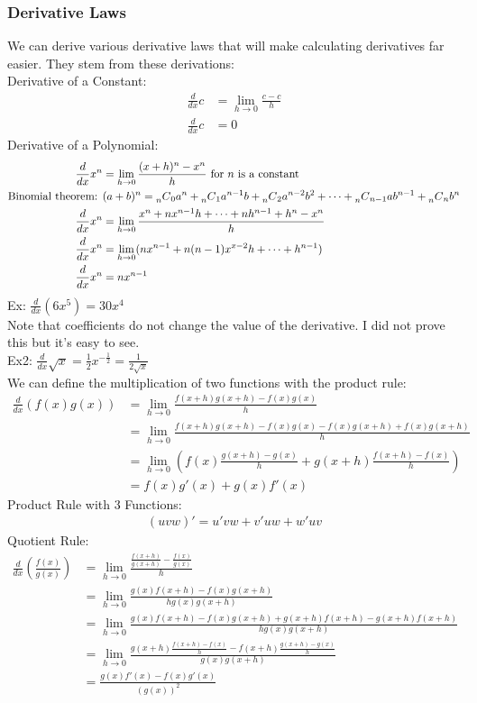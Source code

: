 \documentclass[11pt, fleqn]{article}
\begin{document}
\subsubsection{Derivative Laws}
We can derive various derivative laws that will make calculating derivatives far easier. They stem from these derivations:\\
Derivative of a Constant:
\begin{align*}
    \frac{d}{dx}c&=\lim_{h\to 0}\frac{c-c}{h}\\
    \frac{d}{dx}c&=0
\end{align*}
Derivative of a Polynomial:
\begin{align*}
    \frac{d}{dx}x^n&=\lim\limits_{h\to 0}\frac{(x+h)^n-x^n}{h}\text{ for $n$ is a constant}\\
    \text{Binomial theorem: }& (a+b)^n=\prescript{}{n}{C}_0a^n+\prescript{}{n}{C}_1a^{n-1}b+\prescript{}{n}{C}_2a^{n-2}b^2+\cdots+\prescript{}{n}{C}_{n-1}ab^{n-1}+\prescript{}{n}{C}_nb^n\\
    \frac{d}{dx}x^n&=\lim\limits_{h\to 0}\frac{x^n+nx^{n-1}h+\cdots+nh^{n-1}+h^n-x^n}{h}\\
    \frac{d}{dx}x^n&=\lim\limits_{h\to 0}(nx^{n-1}+n(n-1)x^{x-2}h+\cdots+h^{n-1})\\
    \frac{d}{dx}x^n&=nx^{n-1}
\end{align*}
Ex: $\frac{d}{dx}(6x^5)=30x^4$\\
Note that coefficients do not change the value of the derivative. I did not prove this but it's easy to see.\\
Ex2: $\frac{d}{dx}\sqrt{x}=\frac{1}{2}x^{-\frac{1}{2}}=\frac{1}{2\sqrt{x}}$\\
We can define the multiplication of two functions with the product rule:
\begin{align*}
    \frac{d}{dx}(f(x)g(x))&=\lim_{h\to 0}\frac{f(x+h)g(x+h)-f(x)g(x)}{h}\\
    &=\lim_{h\to 0}\frac{f(x+h)g(x+h)-f(x)g(x)-f(x)g(x+h)+f(x)g(x+h)}{h}\\
    &=\lim_{h\to 0}\left(f(x)\frac{g(x+h)-g(x)}{h}+g(x+h)\frac{f(x+h)-f(x)}{h}\right)\\
    &=f(x)g'(x)+g(x)f'(x)
\end{align*}
Product Rule with 3 Functions:
\begin{align*}
    (uvw)'=u'vw+v'uw+w'uv
\end{align*}
Quotient Rule:
\begin{align*}
    \frac{d}{dx}\left(\frac{f(x)}{g(x)}\right)&=\lim_{h\to 0}\frac{\frac{f(x+h)}{g(x+h)}-\frac{f(x)}{g(x)}}{h}\\
    &=\lim_{h\to 0}\frac{g(x)f(x+h)-f(x)g(x+h)}{hg(x)g(x+h)}\\
    &=\lim_{h\to 0}\frac{g(x)f(x+h)-f(x)g(x+h)+g(x+h)f(x+h)-g(x+h)f(x+h)}{hg(x)g(x+h)}\\
    &=\lim_{h\to 0}\frac{g(x+h)\frac{f(x+h)-f(x)}{h}-f(x+h)\frac{g(x+h)-g(x)}{h}}{g(x)g(x+h)}\\
    &=\frac{g(x)f'(x)-f(x)g'(x)}{(g(x))^2}
\end{align*}
\end{document}
